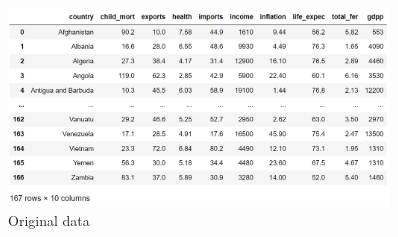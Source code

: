 \documentclass[12pt]{article}
\begin{document}
\begin{itemize}
\begin{figure}[H]
  \centering
  \includegraphics[width=0.9\textwidth]{figures/data.png}
  \caption{Original data}\label{data}
\end{figure}


\end{itemize}
\end{document}
